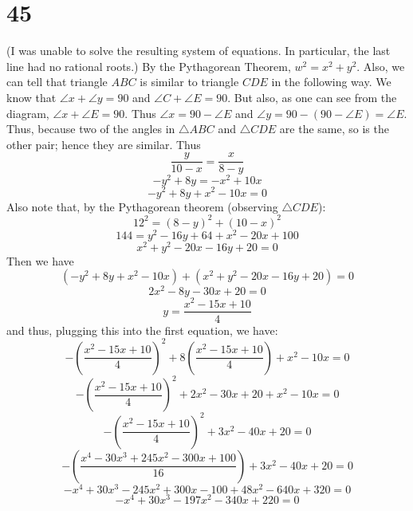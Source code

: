 \documentclass{article}
\theoremstyle{definition}
\newcommand{\?}{\stackrel{?}{=}}
\begin{document}
\section*{45}
(I was unable to solve the resulting system of equations. In particular, the last line had no rational roots.)\newline
By the Pythagorean Theorem, $w^2=x^2+y^2$. Also, we can tell that triangle $ABC$ is similar to triangle $CDE$ in the following way. We know that 
$\angle x+\angle y=90$ and $\angle C+\angle E=90$. But also, as one can see from the diagram, 
$\angle x+\angle E=90$. Thus $\angle x=90-\angle E$ and $\angle y=90-(90-\angle E)=\angle E$. Thus, because two of the angles in $\triangle ABC$ and $\triangle CDE$ are the same, so is the other 
pair; hence they are similar. Thus \[ \frac{y}{10-x}=\frac{x}{8-y} \]
\[ -y^2+8y=-x^2+10x \] \[ -y^2+8y+x^2-10x=0 \] Also note that, by the Pythagorean theorem (observing $\triangle CDE$):
\[ 12^2=(8-y)^2+(10-x)^2 \]
\[ 144=y^2-16y+64+x^2-20x+100 \]
\[ x^2+y^2-20x-16y+20=0 \]
Then we have
\[ (-y^2+8y+x^2-10x)+(x^2+y^2-20x-16y+20)=0 \]
\[ 2x^2-8y-30x+20=0 \]
\[ y=\frac{x^2-15x+10}{4} \]
and thus, plugging this into the first equation, we have:
\[ -\left(\frac{x^2-15x+10}{4}\right)^2+8\left(\frac{x^2-15x+10}{4}\right)+x^2-10x=0 \]
\[ -\left(\frac{x^2-15x+10}{4}\right)^2+2x^2-30x+20+x^2-10x=0 \]
\[ -\left(\frac{x^2-15x+10}{4}\right)^2+3x^2-40x+20=0 \]
\[ -\left(\frac{x^4-30x^3+245x^2-300x+100}{16}\right)+3x^2-40x+20=0 \]
\[ -x^4+30x^3-245x^2+300x-100+48x^2-640x+320=0 \]
\[ -x^4+30x^3-197x^2-340x+220=0 \]
\end{document}
